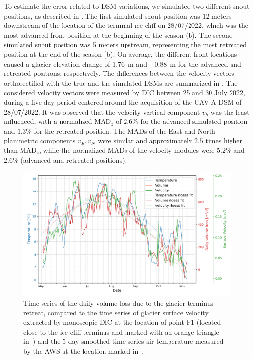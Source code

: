 To estimate the error related to DSM variations, we simulated two different snout
positions, as described in .
The first simulated snout position was 12 meters
downstream of the location of the terminal ice cliff on 28/07/2022, which was the most
advanced front position at the beginning of the season
(b).
The second simulated snout position was 5 meters upstream, representing the most
retreated position at the end of the season (b).
On average, the different front locations caused a glacier elevation change of
\SI{+1.76}{\meter} and \SI{-0.88}{\meter} for the advanced
and retreated positions, respectively.
The differences between the velocity vectors orthorectified with the true and the
simulated DSMs are
summarized in .
The considered velocity vectors were measured by DIC between 25 and 30 July 2022, during
a five-day period centered around the acquisition of the UAV-A DSM of 28/07/2022.
It was observed that the velocity vertical component \(v_h\) was the least influenced,
with a normalized MAD\(_z\) of \(2.6\%\) for
the advanced simulated position and \(1.3\%\) for the retreated position. The MADs of the
East and North planimetric components \(v_E, v_N\) were similar and approximately \(2.5\)
times higher than MAD\(_z\), while the normalized MADs of the velocity modules were
\(5.2\%\) and \(2.6\%\) (advanced and retreated positions).

\begin{figure}[ht]
  \centering
  \includegraphics[width=1\textwidth]{4_TS_P1.png}
  \caption{Time series of the daily volume loss due to the glacier terminus retreat,
    compared to the time series of glacier surface velocity extracted by monoscopic DIC at the location of point P1 (located close to the ice cliff terminus and marked with an orange triangle in~) and the 5-day smoothed time series air temperature measured by the AWS at the location marked in~.}
  \label{fig:4:TS_punto-fronte}
\end{figure}

